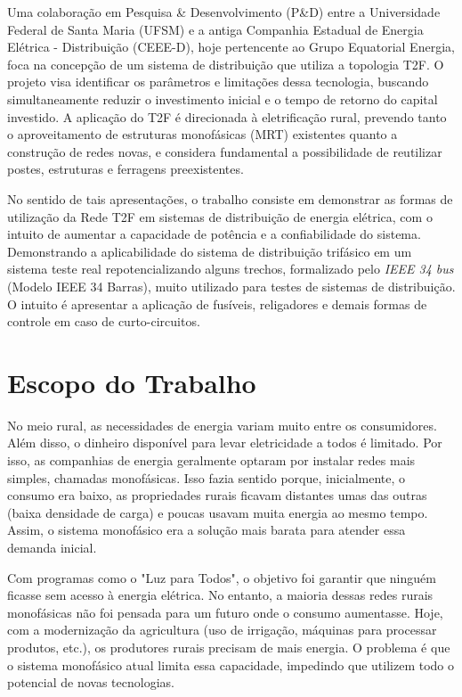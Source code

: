 \documentclass[oneside,openright,12pt]{ufsm_2021} %
\begin{document}
\par Uma colaboração em Pesquisa \& Desenvolvimento (P\&D) entre a Universidade Federal de Santa Maria (UFSM) e a antiga Companhia Estadual de Energia Elétrica - Distribuição (CEEE-D), hoje pertencente ao Grupo Equatorial Energia, foca na concepção de um sistema de distribuição que utiliza a topologia T2F. O projeto visa identificar os parâmetros e limitações dessa tecnologia, buscando simultaneamente reduzir o investimento inicial e o tempo de retorno do capital investido. A aplicação do T2F é direcionada à eletrificação rural, prevendo tanto o aproveitamento de estruturas monofásicas (MRT) existentes quanto a construção de redes novas, e considera fundamental a possibilidade de reutilizar postes, estruturas e ferragens preexistentes.

\par No sentido de tais apresentações, o trabalho consiste em demonstrar as formas de utilização da Rede T2F em sistemas de distribuição de energia elétrica, com o intuito de aumentar a capacidade de potência e a confiabilidade do sistema. Demonstrando a aplicabilidade do sistema de distribuição trifásico em um sistema teste real repotencializando alguns trechos, formalizado pelo \textit{IEEE 34 bus} (Modelo IEEE 34 Barras), muito utilizado para testes de sistemas de distribuição. O intuito é apresentar a aplicação de fusíveis, religadores e demais formas de controle em caso de curto-circuitos.

\section{Escopo do Trabalho}

\par No meio rural, as necessidades de energia variam muito entre os consumidores. Além disso, o dinheiro disponível para levar eletricidade a todos é limitado. Por isso, as companhias de energia geralmente optaram por instalar redes mais simples, chamadas monofásicas. Isso fazia sentido porque, inicialmente, o consumo era baixo, as propriedades rurais ficavam distantes umas das outras (baixa densidade de carga) e poucas usavam muita energia ao mesmo tempo. Assim, o sistema monofásico era a solução mais barata para atender essa demanda inicial.

\par Com programas como o "Luz para Todos", o objetivo foi garantir que ninguém ficasse sem acesso à energia elétrica. No entanto, a maioria dessas redes rurais monofásicas não foi pensada para um futuro onde o consumo aumentasse. Hoje, com a modernização da agricultura (uso de irrigação, máquinas para processar produtos, etc.), os produtores rurais precisam de mais energia. O problema é que o sistema monofásico atual limita essa capacidade, impedindo que utilizem todo o potencial de novas tecnologias.
\end{document}
